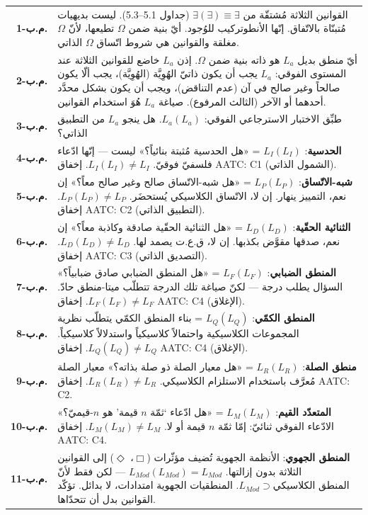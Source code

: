\documentclass[10pt, openany, oneside]{book}
\renewcommand{\footnotesize}{\fontsize{8.5}{11}\selectfont}
\begin{document}
{\footnotesize
\noindent\begin{tabular}{r p{}}
\textbf{م.ب-1.} & القوانين الثلاثة مُشتقّة من $\exists(\exists) \equiv \exists$ (جداول 5.1--5.3). ليست بديهيات مُتبنّاة بالاتّفاق. إنّها الأنطوتركيب للوُجود. أيّ بنية ضمن $\Omega$ تطيعها، لأنّ $\Omega$ مغلقة والقوانين هي شروط اتّساق $\Omega$ الذاتي. \\[0.3em]
\textbf{م.ب-2.} & أيّ منطق بديل $L_a$ هو ذاته بنية ضمن $\Omega$. إذن $L_a$ خاضع للقوانين الثلاثة عند المستوى الفوقي: $L_a$ يجب أن يكون ذاتيّ الهُوِيَّة (الهُوِيَّة)، يجب ألّا يكون صالحاً وغير صالح في آن (عدم التناقض)، ويجب أن يكون بشكل محدَّد أحدهما أو الآخر (الثالث المرفوع). صياغة $L_a$ هُوَ استخدام القوانين. \\[0.3em]
\textbf{م.ب-3.} & طبِّق الاختبار الاسترجاعي الفوقي: $L_a(L_a)$. هل ينجو $L_a$ من التطبيق الذاتي؟ \\[0.3em]
\textbf{م.ب-4.} & \textbf{الحدسية}: $L_I(L_I)$ = «هل الحدسية مُثبتة بنائياً؟» ليست --- إنّها ادّعاء فلسفيّ فوقيّ. $L_I(L_I) \neq L_I$. إخفاق AATC: C1 (الشمول الذاتي). \\[0.3em]
\textbf{م.ب-5.} & \textbf{شبه-الاتّساق}: $L_P(L_P)$ = «هل شبه-الاتّساق صالح وغير صالح معاً؟» إن نعم، التمييز ينهار. إن لا، الاتّساق الكلاسيكي يُستحضَر. $L_P(L_P) \neq L_P$. إخفاق AATC: C2 (التطبيق الذاتي). \\[0.3em]
\textbf{م.ب-6.} & \textbf{الثنائية الحقّية}: $L_D(L_D)$ = «هل الثنائية الحقّية صادقة وكاذبة معاً؟» إن نعم، صدقها مقوَّض بكذبها. إن لا، ق.ع.ت يصمد لها. $L_D(L_D) \neq L_D$. إخفاق AATC: C3 (التصديق الذاتي). \\[0.3em]
\textbf{م.ب-7.} & \textbf{المنطق الضبابي}: $L_F(L_F)$ = «هل المنطق الضبابي صادق ضبابياً؟» السؤال يطلب درجة --- لكنّ صياغة تلك الدرجة تتطلّب ميتا-منطق حادّ. $L_F(L_F) \neq L_F$. إخفاق AATC: C4 (الإغلاق). \\[0.3em]
\textbf{م.ب-8.} & \textbf{المنطق الكمّي}: $L_Q(L_Q)$ = بناء المنطق الكمّي يتطلّب نظرية المجموعات الكلاسيكية واحتمالاً كلاسيكياً واستدلالاً كلاسيكياً. $L_Q(L_Q) \neq L_Q$. إخفاق AATC: C4 (الإغلاق). \\[0.3em]
\textbf{م.ب-9.} & \textbf{منطق الصلة}: $L_R(L_R)$ = «هل معيار الصلة ذو صلة بذاته؟» معيار الصلة مُعرَّف باستخدام الاستلزام الكلاسيكي. $L_R(L_R) \neq L_R$. إخفاق AATC: C2. \\[0.3em]
\textbf{م.ب-10.} & \textbf{المتعدّد القيم}: $L_M(L_M)$ = «هل ادّعاء `ثمّة $n$ قيمة' هو $n$-قيميّ؟» الادّعاء الفوقي ثنائيّ: إمّا ثمّة $n$ قيمة أو لا. $L_M(L_M) \neq L_M$. إخفاق AATC: C4. \\[0.3em]
\textbf{م.ب-11.} & \textbf{المنطق الجهوي}: الأنظمة الجهوية تُضيف مؤثّرات ($\Box$، $\Diamond$) إلى القوانين الثلاثة بدون إزالتها. $L_{Mod}(L_{Mod}) = L_{Mod}$ --- لكن فقط لأنّ $L_{Mod} \supset \text{المنطق الكلاسيكي}$. المنطقيات الجهوية امتدادات، لا بدائل. تؤكّد القوانين بدل أن تتحدّاها. \\[0.3em]

\end{tabular}}
\end{document}
